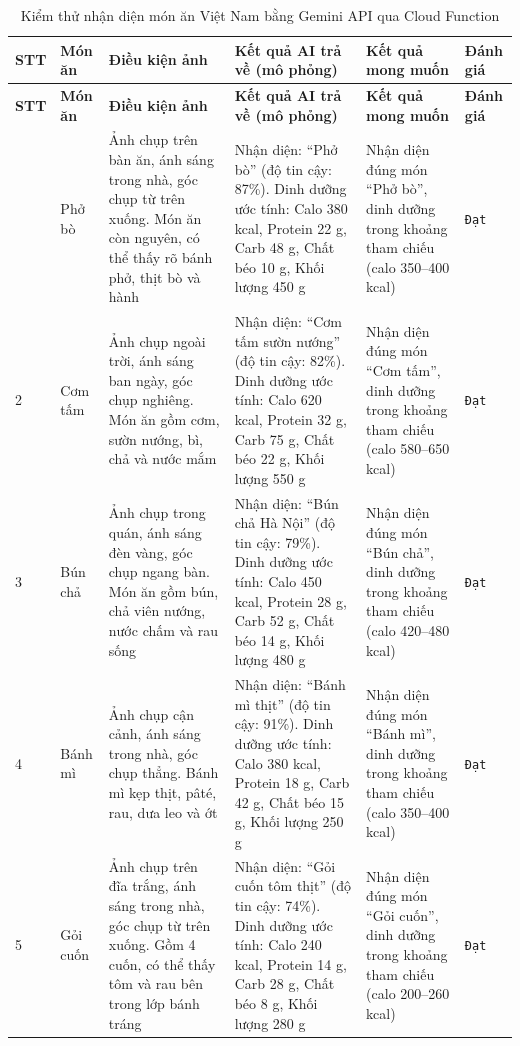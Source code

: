 \begingroup
\small
\begin{longtable}{|p{0.6cm}|p{2.4cm}|p{2.8cm}|p{4cm}|p{3.8cm}|p{1.8cm}|}
    \caption{Kiểm thử nhận diện món ăn Việt Nam bằng Gemini API qua Cloud Function}
    \label{tab:ai_scan_test} \\
    \hline
    \textbf{STT} & \textbf{Món ăn} & \textbf{Điều kiện ảnh} & \textbf{Kết quả AI trả về (mô phỏng)} & \textbf{Kết quả mong muốn} & \textbf{Đánh giá} \\
    \hline
    \endfirsthead
    \hline
    \textbf{STT} & \textbf{Món ăn} & \textbf{Điều kiện ảnh} & \textbf{Kết quả AI trả về (mô phỏng)} & \textbf{Kết quả mong muốn} & \textbf{Đánh giá} \\
    \hline
    \endhead
    \hline
    \endfoot
    1 & Phở bò & Ảnh chụp trên bàn ăn, ánh sáng trong nhà, góc chụp từ trên xuống. Món ăn còn nguyên, có thể thấy rõ bánh phở, thịt bò và hành & Nhận diện: ``Phở bò'' (độ tin cậy: 87\%). Dinh dưỡng ước tính: Calo 380 kcal, Protein 22 g, Carb 48 g, Chất béo 10 g, Khối lượng 450 g & Nhận diện đúng món ``Phở bò'', dinh dưỡng trong khoảng tham chiếu (calo 350--400 kcal) & \texttt{Đạt} \\
    \hline
    2 & Cơm tấm & Ảnh chụp ngoài trời, ánh sáng ban ngày, góc chụp nghiêng. Món ăn gồm cơm, sườn nướng, bì, chả và nước mắm & Nhận diện: ``Cơm tấm sườn nướng'' (độ tin cậy: 82\%). Dinh dưỡng ước tính: Calo 620 kcal, Protein 32 g, Carb 75 g, Chất béo 22 g, Khối lượng 550 g & Nhận diện đúng món ``Cơm tấm'', dinh dưỡng trong khoảng tham chiếu (calo 580--650 kcal) & \texttt{Đạt} \\
    \hline
    3 & Bún chả & Ảnh chụp trong quán, ánh sáng đèn vàng, góc chụp ngang bàn. Món ăn gồm bún, chả viên nướng, nước chấm và rau sống & Nhận diện: ``Bún chả Hà Nội'' (độ tin cậy: 79\%). Dinh dưỡng ước tính: Calo 450 kcal, Protein 28 g, Carb 52 g, Chất béo 14 g, Khối lượng 480 g & Nhận diện đúng món ``Bún chả'', dinh dưỡng trong khoảng tham chiếu (calo 420--480 kcal) & \texttt{Đạt} \\
    \hline
    4 & Bánh mì & Ảnh chụp cận cảnh, ánh sáng trong nhà, góc chụp thẳng. Bánh mì kẹp thịt, pâté, rau, dưa leo và ớt & Nhận diện: ``Bánh mì thịt'' (độ tin cậy: 91\%). Dinh dưỡng ước tính: Calo 380 kcal, Protein 18 g, Carb 42 g, Chất béo 15 g, Khối lượng 250 g & Nhận diện đúng món ``Bánh mì'', dinh dưỡng trong khoảng tham chiếu (calo 350--400 kcal) & \texttt{Đạt} \\
    \hline
    5 & Gỏi cuốn & Ảnh chụp trên đĩa trắng, ánh sáng trong nhà, góc chụp từ trên xuống. Gồm 4 cuốn, có thể thấy tôm và rau bên trong lớp bánh tráng & Nhận diện: ``Gỏi cuốn tôm thịt'' (độ tin cậy: 74\%). Dinh dưỡng ước tính: Calo 240 kcal, Protein 14 g, Carb 28 g, Chất béo 8 g, Khối lượng 280 g & Nhận diện đúng món ``Gỏi cuốn'', dinh dưỡng trong khoảng tham chiếu (calo 200--260 kcal) & \texttt{Đạt} \\

\end{longtable}

